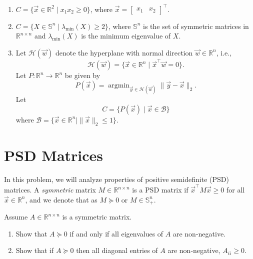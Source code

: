 \documentclass[10pt]{article}
\theoremstyle{definition}
\theoremstyle{plain}
\newcommand{\RR}{\mathbb{R}}
\DeclareMathOperator*{\argmin}{argmin}
\begin{document}
\begin{enumerate}[label=(\alph*)]
    \item $C = \{\vec{x} \in \RR^2 \mid x_1 x_2 \ge 0\}$, where $\vec{x} = \begin{bmatrix} x_1 & x_2 \end{bmatrix}^\top$.

    \item $C = \{X \in \mathbb{S}^n \mid \lambda_{\min}(X) \ge 2\}$, where $\mathbb{S}^n$ is the set of symmetric matrices in $\RR^{n \times n}$ and $\lambda_{\min}(X)$ is the minimum eigenvalue of $X$.

    \item Let $\mathcal{H}(\vec{w})$ denote the hyperplane with normal direction $\vec{w} \in \RR^n$, i.e.,
    \begin{equation}
        \mathcal{H}(\vec{w}) = \{\vec{x} \in \RR^n \mid \vec{x}^\top \vec{w} = 0\}.
    \end{equation}
    Let $P : \RR^n \to \RR^n$ be given by
    \begin{equation}
        P(\vec{x}) = \argmin_{\vec{y} \in \mathcal{H}(\vec{w})} \|\vec{y} - \vec{x}\|_2.
    \end{equation}
    Let
    \begin{equation}
        C = \{P(\vec{x}) \mid \vec{x} \in \mathcal{B}\}
    \end{equation}
    where $\mathcal{B} = \{\vec{x} \in \RR^n \mid \|\vec{x}\|_2 \le 1\}$.
\end{enumerate}

\section{PSD Matrices}

In this problem, we will analyze properties of positive semidefinite (PSD) matrices. A \emph{symmetric} matrix $M \in \RR^{n \times n}$ is a PSD matrix if $\vec{x}^\top M \vec{x} \ge 0$ for all $\vec{x} \in \RR^n$, and we denote that as $M \succeq 0$ or $M \in \mathbb{S}^n_+$.

Assume $A \in \RR^{n \times n}$ is a symmetric matrix.

\begin{enumerate}[label=(\alph*)]
    \item Show that $A \succeq 0$ if and only if all eigenvalues of $A$ are non-negative.

    \item Show that if $A \succeq 0$ then all diagonal entries of $A$ are non-negative, $A_{ii} \ge 0$.
\end{enumerate}
\end{document}
